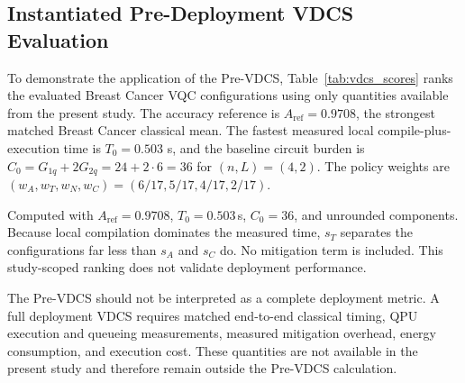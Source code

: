 \documentclass[final,5p,times,number]{elsarticle}
\begin{document}
\subsection{Instantiated Pre-Deployment VDCS Evaluation}
\label{sec:vdcs_validation}

To demonstrate the application of the Pre-VDCS, Table~\ref{tab:vdcs_scores}
ranks the evaluated Breast Cancer VQC configurations using only
quantities available from the present study. The accuracy reference is
$A_{\mathrm{ref}}=0.9708$, the strongest matched Breast Cancer
classical mean.
The fastest measured local compile-plus-execution time is $T_0=0.503$ s, and the baseline circuit burden is $C_0=G_{1q}+2G_{2q}=24+2\cdot 6=36$ for $(n,L)=(4,2)$. The policy
weights are $(w_A,w_T,w_N,w_C)=(6/17,5/17,4/17,2/17)$.

\begin{table}[!htbp]
  \centering
  \caption{Pre-Deployment VQC Deployment Competitiveness Scores (Pre-VDCS) for Breast Cancer Classification}
  \label{tab:vdcs_scores}
  \small
  \setlength{\tabcolsep}{3pt}
  \begin{tablenotes}
    \small
    \item Computed with $A_{\mathrm{ref}}=0.9708$, $T_0=0.503$\,s, $C_0=36$, and unrounded components. Because local compilation dominates the measured time, $s_T$ separates the configurations far less than $s_A$ and $s_C$ do. No mitigation term is included. This study-scoped ranking does not validate deployment performance.
  \end{tablenotes}
\end{table}

The Pre-VDCS should not be interpreted as a complete deployment metric. A full deployment VDCS requires matched end-to-end classical
timing, QPU execution and queueing measurements, measured mitigation overhead, energy consumption, and execution cost. These quantities are not available in the present study and therefore remain outside the
Pre-VDCS calculation.
\end{document}
